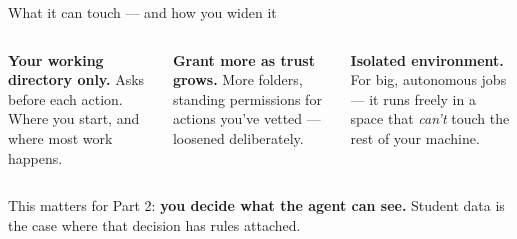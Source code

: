 \documentclass[aspectratio=169, 10pt]{beamer}
\begin{document}
\begin{frame}{What it can touch --- and how you widen it}
\vskip2pt
\begin{columns}[T,onlytextwidth]
\begin{column}{0.32\textwidth}
\begin{tcolorbox}[colback=PaleSage, colframe=SlateTeal, boxrule=0.9pt, arc=3pt, left=5pt, right=5pt, top=3pt, bottom=3pt, title={\faFolderOpen\quad 1. Default}, fonttitle=\bfseries\small\color{white}, coltitle=white, colbacktitle=SlateTeal]
\footnotesize
\textbf{Your working directory only.}
\vskip2pt
Asks before each action. Where you start, and where most work happens.
\end{tcolorbox}
\end{column}
\begin{column}{0.32\textwidth}
\begin{tcolorbox}[colback=LightGold, colframe=UVMGold, boxrule=0.9pt, arc=3pt, left=5pt, right=5pt, top=3pt, bottom=3pt, title={\faKey\quad 2. Widen}, fonttitle=\bfseries\small\color{white}, coltitle=white, colbacktitle=UVMGold]
\footnotesize
\textbf{Grant more as trust grows.}
\vskip2pt
More folders, standing permissions for actions you've vetted --- loosened deliberately.
\end{tcolorbox}
\end{column}
\begin{column}{0.32\textwidth}
\begin{tcolorbox}[colback=PaleSage, colframe=CoolGray, boxrule=0.9pt, arc=3pt, left=5pt, right=5pt, top=3pt, bottom=3pt, title={\faServer\quad 3. Sandbox / VM}, fonttitle=\bfseries\small\color{white}, coltitle=white, colbacktitle=CoolGray]
\footnotesize
\textbf{Isolated environment.}
\vskip2pt
For big, autonomous jobs --- it runs freely in a space that \emph{can't} touch the rest of your machine.
\end{tcolorbox}
\end{column}
\end{columns}
\vfill
\begin{tcolorbox}[accentbox, top=2pt, bottom=2pt]
\small This matters for Part 2: \textbf{you decide what the agent can see.} Student data is the case where that decision has rules attached.
\end{tcolorbox}
\end{frame}

\end{document}
